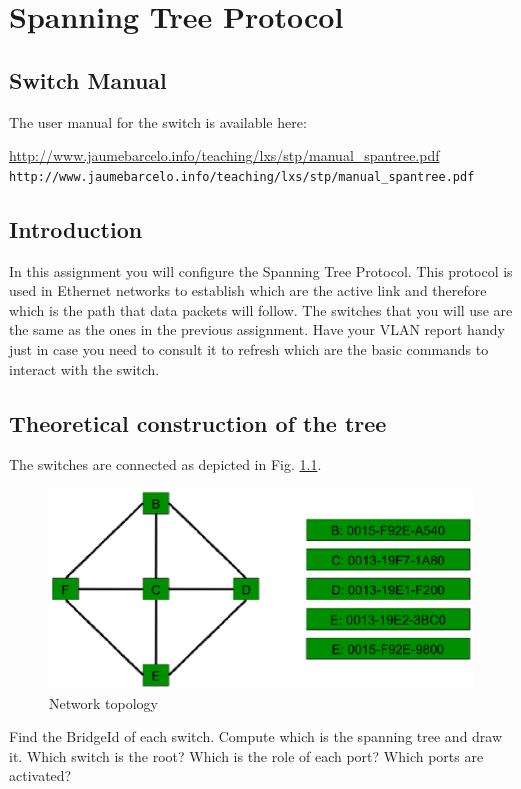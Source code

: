 \chapter{Spanning Tree Protocol}

\section{Switch Manual}
The user manual for the switch is available here:


\ifpdf
\url{http://www.jaumebarcelo.info/teaching/lxs/stp/manual_spantree.pdf}
\else
\texttt{http://www.jaumebarcelo.info/teaching/lxs/stp/manual\_spantree.pdf}
\fi


\section{Introduction}

In this assignment you will configure the Spanning Tree Protocol.
This protocol is used in Ethernet networks to establish which are the active link and therefore which is the path that data packets will follow.
The switches that you will use are the same as the ones in the previous assignment.
Have your VLAN report handy just in case you need to consult it to refresh which are the basic commands to interact with the switch.

\section{Theoretical construction of the tree}
The switches are connected as depicted in Fig. \ref{fig:stp_topology}.
\begin{figure}[htbp]
  \centering
  \includegraphics[width=0.8\linewidth]{figures/stp_topology.eps}
  \caption{Network topology}
  \label{fig:stp_topology}
\end{figure}

Find the BridgeId of each switch.
Compute which is the spanning tree and draw it.
Which switch is the root?
Which is the role of each port?
Which ports are activated?

